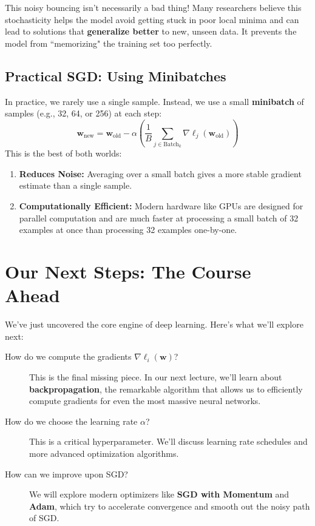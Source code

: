 \documentclass[11pt, a4paper]{article}
\begin{document}
This noisy bouncing isn't necessarily a bad thing! Many researchers believe this stochasticity helps the model avoid getting stuck in poor local minima and can lead to solutions that \textbf{generalize better} to new, unseen data. It prevents the model from ``memorizing" the training set too perfectly.

\subsection{Practical SGD: Using Minibatches}
In practice, we rarely use a single sample. Instead, we use a small \textbf{minibatch} of samples (e.g., 32, 64, or 256) at each step:
\begin{equation}
\mathbf{w}_{\text{new}} = \mathbf{w}_{\text{old}} - \alpha \left( \frac{1}{B} \sum_{j \in \text{Batch}_k} \nabla \ell_j(\mathbf{w}_{\text{old}}) \right)
\end{equation}
This is the best of both worlds:
\begin{enumerate}
    \item \textbf{Reduces Noise:} Averaging over a small batch gives a more stable gradient estimate than a single sample.
    \item \textbf{Computationally Efficient:} Modern hardware like GPUs are designed for parallel computation and are much faster at processing a small batch of 32 examples at once than processing 32 examples one-by-one.
\end{enumerate}

\section{Our Next Steps: The Course Ahead}
We've just uncovered the core engine of deep learning. Here’s what we'll explore next:

\begin{description}
    \item[How do we compute the gradients $\nabla \ell_i(\mathbf{w})$?] This is the final missing piece. In our next lecture, we'll learn about \textbf{backpropagation}, the remarkable algorithm that allows us to efficiently compute gradients for even the most massive neural networks.
    
    \item[How do we choose the learning rate $\alpha$?] This is a critical hyperparameter. We'll discuss learning rate schedules and more advanced optimization algorithms.
    
    \item[How can we improve upon SGD?] We will explore modern optimizers like \textbf{SGD with Momentum} and \textbf{Adam}, which try to accelerate convergence and smooth out the noisy path of SGD.
\end{description}
\end{document}
